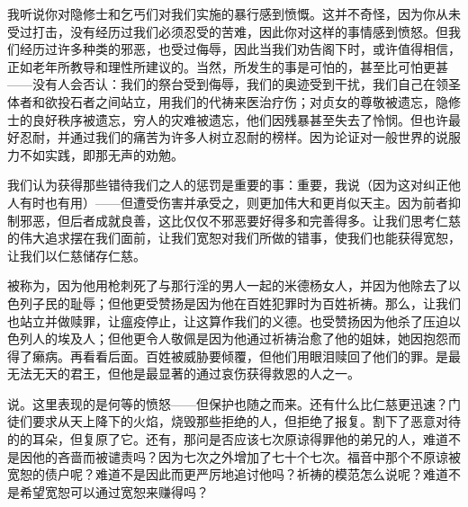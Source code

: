 我听说你对隐修士和乞丐们对我们实施的暴行感到愤慨。这并不奇怪，因为你从未受过打击，没有经历过我们必须忍受的苦难，因此你对这样的事情感到愤怒。但我们经历过许多种类的邪恶，也受过侮辱，因此当我们劝告阁下时，或许值得相信，正如老年所教导和理性所建议的。当然，所发生的事是可怕的，甚至比可怕更甚——没有人会否认：我们的祭台受到侮辱，我们的奥迹受到干扰，我们自己在领圣体者和欲投石者之间站立，用我们的代祷来医治疗伤；对贞女的尊敬被遗忘，隐修士的良好秩序被遗忘，穷人的灾难被遗忘，他们因残暴甚至失去了怜悯。但也许最好忍耐，并通过我们的痛苦为许多人树立忍耐的榜样。因为论证对一般世界的说服力不如实践，即那无声的劝勉。\par

我们认为获得那些错待我们之人的惩罚是重要的事：重要，我说（因为这对纠正他人有时也有用）——但遭受伤害并承受之，则更加伟大和更肖似天主。因为前者抑制邪恶，但后者成就良善，这比仅仅不邪恶要好得多和完善得多。让我们思考仁慈的伟大追求摆在我们面前，让我们宽恕对我们所做的错事，使我们也能获得宽恕，让我们以仁慈储存仁慈。\par

被称为，因为他用枪刺死了与那行淫的男人一起的米德杨女人，并因为他除去了以色列子民的耻辱；但他更受赞扬是因为他在百姓犯罪时为百姓祈祷。那么，让我们也站立并做赎罪，让瘟疫停止，让这算作我们的义德。也受赞扬因为他杀了压迫以色列人的埃及人；但他更令人敬佩是因为他通过祈祷治愈了他的姐妹，她因抱怨而得了癞病。再看看后面。百姓被威胁要倾覆，但他们用眼泪赎回了他们的罪。是最无法无天的君王，但他是最显著的通过哀伤获得救恩的人之一。\par

 说。这里表现的是何等的愤怒——但保护也随之而来。还有什么比仁慈更迅速？门徒们要求从天上降下的火焰，烧毁那些拒绝的人，但拒绝了报复。割下了恶意对待的的耳朵，但复原了它。还有，那问是否应该七次原谅得罪他的弟兄的人，难道不是因他的吝啬而被谴责吗？因为七次之外增加了七十个七次。福音中那个不原谅被宽恕的债户呢？难道不是因此而更严厉地追讨他吗？祈祷的模范怎么说呢？难道不是希望宽恕可以通过宽恕来赚得吗？\par

